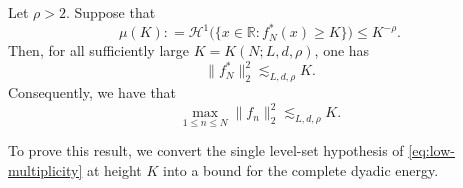 \documentclass[12pt]{amsart}
\numberwithin{equation}{section}
\begin{document}
\begin{theorem}\label{thm:improved-L2}
Let $\rho>2$.  Suppose that
\begin{equation}\label{eq:low-multiplicity}
 \mu(K) : = \mathcal{H}^1 \big(\big\{x \in \mathbb{R} : f_{N}^* (x) \geq K \big\} \big)\leq K^{-\rho}.
\end{equation}
Then, for all sufficiently large $K=K(N;L,d,\rho)$, one has
\begin{equation}\label{eq:improved-L2}
 \|f_N^*\|_2^2\lesssim_{L,d,\rho}K.
\end{equation}
Consequently, we have that
\[
 \max_{1\leq n\leq N}\|f_n\|_2^2\lesssim_{L,d,\rho}K.
\]
\end{theorem}

To prove this result, we convert the single level-set hypothesis of \eqref{eq:low-multiplicity} at height $K$ into a bound for the complete dyadic energy.
\end{document}
